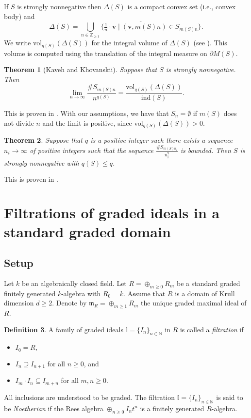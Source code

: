 \documentclass[12pt,a4paper]{amsart}
\theoremstyle{plain}
\newtheorem{theorem}{Theorem}[section]
\theoremstyle{definition}
\newtheorem{definition}[theorem]{Definition}
\numberwithin{equation}{theorem}
\newcommand{\mm}{\mathfrak{m}}
\begin{document}
If $S$ is strongly nonnegative then $\Delta(S)$ is a compact convex set (i.e., convex body) and $$\Delta(S) = \overline{\bigcup\limits_{n\in\mathbb{Z}_{\geq 1}}\Big\{\tfrac{1}{n}\cdot \mathbf{v}\mid \left(\mathbf{v},m(S)n\right)\in S_{m(S)n}\Big\}}.$$ We write $\mathrm{vol}_{q(S)}\left(\Delta(S)\right)$ for the integral volume of $\Delta(S)$ (see \cite[Definition 1.13]{KK12}). This volume is computed using the translation of the integral measure on $\partial M(S)$.

\begin{theorem}[Kaveh and Khovanskii]\label{KK1} Suppose that $S$ is strongly nonnegative. Then $$\lim_{n\to\infty}\dfrac{\#S_{m(S)n}}{n^{q(S)}} = \dfrac{\mathrm{vol}_{q(S)}\left(\Delta(S)\right)}{\mathrm{ind}(S)}.$$
\end{theorem}
This is proven in \cite[Corollary 1.16]{KK12}. With our assumptions, we have that $S_n = \emptyset$ if $m(S)$ does not divide $n$ and the limit is positive, since $\mathrm{vol}_{q(S)}\left(\Delta(S)\right)>0$.

\begin{theorem}\label{KK2}
Suppose that $q$ is a positive integer such there exists a sequence $n_i \to\infty$ of positive integers such that the sequence $\frac{\#S_{m(S)n_i}}{n_i^q}$ is bounded. Then $S$ is strongly nonnegative with $q(S)\leq q$.
\end{theorem}
This is proven in \cite[Theorem 1.18]{KK12}.

\section{Filtrations of graded ideals in a standard graded domain}\label{section 4}

\subsection{Setup}\label{setup}
Let $k$ be an algebraically closed field. Let $R=\oplus_{m\geq 0}R_m$ be a standard graded finitely generated $k$-algebra with $R_0=k$. Assume that $R$ is a domain of Krull dimension $d\geq 2$. Denote by $\mm_R=\oplus_{m\geq 1}R_m$ the unique graded maximal ideal of $R$.

\begin{definition}\label{def_filt}
 A family of graded ideals $\mathbb{I}=\{I_n\}_{n\in\mathbb{N}}$ in $R$ is called a \emph{filtration} if
 \begin{itemize}
  \item $I_0 = R$,
  \item $I_n \supseteq I_{n+1}$ for all $n\geq 0$, and
  \item $I_m \cdot I_n \subseteq I_{m+n}$ for all $m,n\geq 0$.
 \end{itemize}
All inclusions are understood to be graded. The filtration $\mathbb{I}=\{I_n\}_{n\in\mathbb{N}}$ is said to be \emph{Noetherian} if the Rees algebra $\oplus_{n\geq 0}I_nt^n$ is a finitely generated $R$-algebra.
\end{definition}
\end{document}
